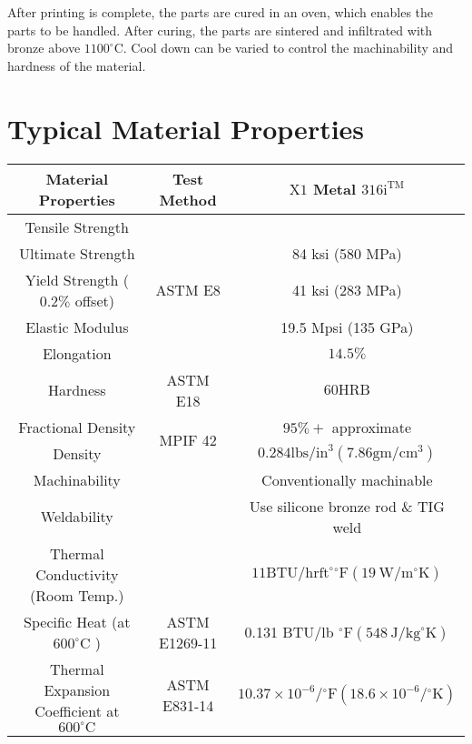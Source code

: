 \documentclass[10pt]{article}
\begin{document}
After printing is complete, the parts are cured in an oven, which enables the parts to be handled. After curing, the parts are sintered and infiltrated with bronze above $1100^{\circ} \mathrm{C}$. Cool down can be varied to control the machinability and hardness of the material.

\section*{Typical Material Properties}
\begin{center}
\begin{tabular}{|c|c|c|}
\hline
Material Properties & Test Method & $\mathrm{X} 1$ Metal $316 \mathrm{i}^{\mathrm{TM}}$ \\
\hline
Tensile Strength & \multirow{5}{*}{ASTM E8} &  \\
\hline
Ultimate Strength &  & 84 ksi (580 MPa) \\
\hline
Yield Strength ( $0.2 \%$ offset) &  & 41 ksi (283 MPa) \\
\hline
Elastic Modulus &  & 19.5 Mpsi (135 GPa) \\
\hline
Elongation &  & $14.5 \%$ \\
\hline
Hardness & ASTM E18 & $60 \mathrm{HRB}$ \\
\hline
Fractional Density & \multirow{2}{*}{MPIF 42} & $95 \%+$ approximate \\
\hline
Density &  & $0.284 \mathrm{lbs} / \mathrm{in}^{3}\left(7.86 \mathrm{gm} / \mathrm{cm}^{3}\right)$ \\
\hline
Machinability &  & Conventionally machinable \\
\hline
Weldability &  & Use silicone bronze rod \& TIG weld \\
\hline
Thermal Conductivity (Room Temp.) &  & $11 \mathrm{BTU} / \mathrm{hr} \mathrm{ft}^{\circ}{ }^{\circ} \mathrm{F}\left(19 \mathrm{~W} / \mathrm{m}^{\circ} \mathrm{K}\right)$ \\
\hline
Specific Heat (at $600^{\circ} \mathrm{C}$ ) & ASTM E1269-11 & 0.131 BTU/lb ${ }^{\circ} \mathrm{F}\left(548 \mathrm{~J} / \mathrm{kg}^{\circ} \mathrm{K}\right)$ \\
\hline
Thermal Expansion Coefficient at $600^{\circ} \mathrm{C}$ & ASTM E831-14 & $10.37 \times 10^{-6} /{ }^{\circ} \mathrm{F}\left(18.6 \times 10^{-6} /{ }^{\circ} \mathrm{K}\right)$ \\
\hline
\end{tabular}
\end{center}
\end{document}
